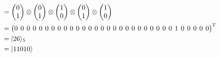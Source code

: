 \documentclass{article}
\begin{document}
\begin{align*}
  &= \begin{pmatrix}0\\1\end{pmatrix}
     \otimes
     \begin{pmatrix}0\\1\end{pmatrix}
     \otimes
     \begin{pmatrix}1\\0\end{pmatrix}
     \otimes
     \begin{pmatrix}0\\1\end{pmatrix}
     \otimes
     \begin{pmatrix}1\\0\end{pmatrix}\\
  &= \begingroup %
     \setlength\arraycolsep{2pt}\setcounter{MaxMatrixCols}{32}
     \begin{pmatrix}0 & 0 & 0 & 0 & 0 & 0 & 0 & 0 & 0 & 0 & 0 & 0 & 0 & 0 & 0 & 0 & 0 & 0 & 0 & 0 & 0 & 0 & 0 & 0 & 0 & 0 & 1 & 0 & 0 & 0 & 0 & 0\end{pmatrix}^{T}
     \endgroup\\
  &= |26\rangle_{5}\\
  &= |11010\rangle
\end{align*}



\printbibliography
\end{document}
